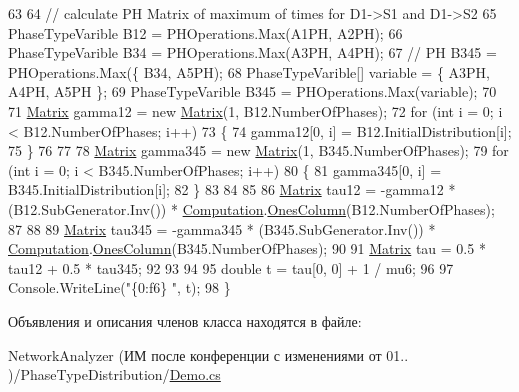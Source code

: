 \begin{DoxyCode}
63 
64             \textcolor{comment}{// calculate PH Matrix of maximum of times for D1->S1 and D1->S2}
65             PhaseTypeVarible B12 = PHOperations.Max(A1PH, A2PH);
66             PhaseTypeVarible B34 = PHOperations.Max(A3PH, A4PH);
67             \textcolor{comment}{// PH B345 = PHOperations.Max(\{ B34, A5PH);}
68             PhaseTypeVarible[] variable = \{ A3PH, A4PH, A5PH \};
69             PhaseTypeVarible B345 = PHOperations.Max(variable);
70 
71             \hyperlink{class_b_l_a_s_1_1_matrix}{Matrix} gamma12 = \textcolor{keyword}{new} \hyperlink{class_b_l_a_s_1_1_matrix}{Matrix}(1, B12.NumberOfPhases);
72             \textcolor{keywordflow}{for} (\textcolor{keywordtype}{int} i = 0; i < B12.NumberOfPhases; i++)
73             \{
74                 gamma12[0, i] = B12.InitialDistribution[i];
75             \}
76 
77 
78             \hyperlink{class_b_l_a_s_1_1_matrix}{Matrix} gamma345 = \textcolor{keyword}{new} \hyperlink{class_b_l_a_s_1_1_matrix}{Matrix}(1, B345.NumberOfPhases);
79             \textcolor{keywordflow}{for} (\textcolor{keywordtype}{int} i = 0; i < B345.NumberOfPhases; i++)
80             \{
81                 gamma345[0, i] = B345.InitialDistribution[i]; 
82             \}
83 
84 
85 
86             \hyperlink{class_b_l_a_s_1_1_matrix}{Matrix} tau12 = -gamma12 * (B12.SubGenerator.Inv()) * 
      \hyperlink{class_b_l_a_s_1_1_computation}{Computation}.\hyperlink{class_b_l_a_s_1_1_computation_ae7bf65dbabdb3c801ccddba5ed866b11}{OnesColumn}(B12.NumberOfPhases);
87 
88 
89             \hyperlink{class_b_l_a_s_1_1_matrix}{Matrix} tau345 = -gamma345 * (B345.SubGenerator.Inv()) * 
      \hyperlink{class_b_l_a_s_1_1_computation}{Computation}.\hyperlink{class_b_l_a_s_1_1_computation_ae7bf65dbabdb3c801ccddba5ed866b11}{OnesColumn}(B345.NumberOfPhases);
90 
91             \hyperlink{class_b_l_a_s_1_1_matrix}{Matrix} tau = 0.5 * tau12 + 0.5 * tau345;
92 
93 
94 
95             \textcolor{keywordtype}{double} t = tau[0, 0] + 1 / mu6;
96 
97             Console.WriteLine(\textcolor{stringliteral}{"\{0:f6\}  "}, t);
98         \}
\end{DoxyCode}


Объявления и описания членов класса находятся в файле\+:\begin{DoxyCompactItemize}
\item 
Network\+Analyzer (ИМ после конференции  с изменениями от 01.. )/\+Phase\+Type\+Distribution/\hyperlink{_phase_type_distribution_2_demo_8cs}{Demo.\+cs}\end{DoxyCompactItemize}
